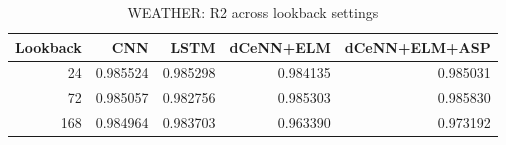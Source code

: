 \begin{table}
\caption{WEATHER: R2 across lookback settings}
\begin{tabular}{rrrrr}
\toprule
Lookback & CNN & LSTM & dCeNN+ELM & dCeNN+ELM+ASP \\
\midrule
24 & 0.985524 & 0.985298 & 0.984135 & 0.985031 \\
72 & 0.985057 & 0.982756 & 0.985303 & 0.985830 \\
168 & 0.984964 & 0.983703 & 0.963390 & 0.973192 \\
\bottomrule
\end{tabular}
\end{table}
